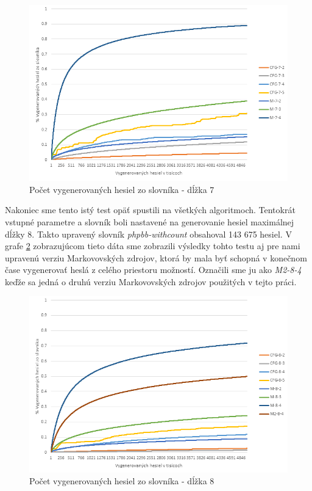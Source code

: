 \begin{figure}[ht]
    \centering
    \includegraphics[width=1\textwidth]{sameDictAcc7}
    \caption{Počet vygenerovaných hesiel zo slovníka - dĺžka 7}
    \label{fig:Acc7}
\end{figure}

Nakoniec sme tento istý test opäť spustili na všetkých algoritmoch. Tentokrát vstupné parametre a slovník boli nastavené na generovanie hesiel maximálnej dĺžky 8. Takto upravený slovník \emph{phpbb-withcount} obsahoval 143 675 hesiel. V grafe \ref{fig:Acc8} zobrazujúcom tieto dáta sme zobrazili výsledky tohto testu aj pre nami upravenú verziu Markovovských zdrojov, ktorá by mala byť schopná v konečnom čase vygenerovať heslá z celého priestoru možností. Označili sme ju ako \emph{M2-8-4} keďže sa jedná o druhú verziu Markovovských zdrojov použitých v tejto práci.

\begin{figure}[ht]
    \centering
    \includegraphics[width=1\textwidth]{sameDictAcc8}
    \caption{Počet vygenerovaných hesiel zo slovníka - dĺžka 8}
    \label{fig:Acc8}
\end{figure}

